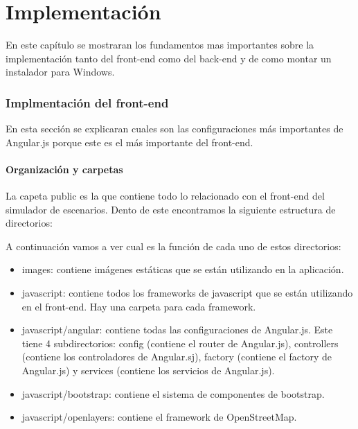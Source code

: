 \chapter{Implementación}

En este capítulo se mostraran los fundamentos mas importantes sobre la implementación tanto del front-end como del back-end y de como montar un instalador para Windows.

\subsection{Implmentación del front-end}

En esta sección se explicaran cuales son las configuraciones más importantes de Angular.js porque este es el más importante del front-end. 

\subsubsection{Organización y carpetas}

La capeta public es la que contiene todo lo relacionado con el front-end del simulador de escenarios. Dento de este encontramos la siguiente estructura de directorios: 


A continuación vamos a ver cual es la función de cada uno de estos directorios:
\begin{itemize}
	\item images: contiene imágenes estáticas que se están utilizando en la aplicación.
	\item javascript: contiene todos los frameworks de javascript que se están utilizando en el front-end. Hay una carpeta para cada framework.
	\item javascript/angular: contiene todas las configuraciones de Angular.js. Este tiene 4 subdirectorios: config (contiene el router de Angular.js), controllers (contiene los controladores de Angular.sj), factory (contiene el factory de Angular.js) y services (contiene los servicios de Angular.js).
	\item javascript/bootstrap: contiene el sistema de componentes de bootstrap.
	\item javascript/openlayers: contiene el framework de OpenStreetMap.
\end{itemize}

